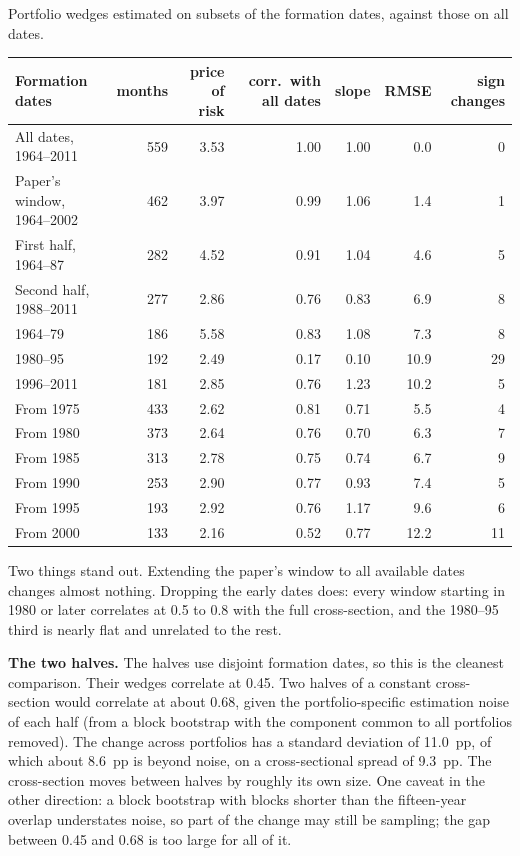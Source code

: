 \documentclass[11pt]{article}
\begin{document}
\begin{tbl}{Portfolio wedges estimated on subsets of the formation dates, against those on all dates.}
\begin{tabular}{lrrrrrr}\toprule
Formation dates & months & price of risk & corr.\ with all dates & slope & RMSE & sign changes\\\midrule
All dates, 1964--2011 & 559 & 3.53 & 1.00 & 1.00 & 0.0 & 0\\
Paper's window, 1964--2002 & 462 & 3.97 & 0.99 & 1.06 & 1.4 & 1\\
First half, 1964--87 & 282 & 4.52 & 0.91 & 1.04 & 4.6 & 5\\
Second half, 1988--2011 & 277 & 2.86 & 0.76 & 0.83 & 6.9 & 8\\
1964--79 & 186 & 5.58 & 0.83 & 1.08 & 7.3 & 8\\
1980--95 & 192 & 2.49 & 0.17 & 0.10 & 10.9 & 29\\
1996--2011 & 181 & 2.85 & 0.76 & 1.23 & 10.2 & 5\\
From 1975 & 433 & 2.62 & 0.81 & 0.71 & 5.5 & 4\\
From 1980 & 373 & 2.64 & 0.76 & 0.70 & 6.3 & 7\\
From 1985 & 313 & 2.78 & 0.75 & 0.74 & 6.7 & 9\\
From 1990 & 253 & 2.90 & 0.77 & 0.93 & 7.4 & 5\\
From 1995 & 193 & 2.92 & 0.76 & 1.17 & 9.6 & 6\\
From 2000 & 133 & 2.16 & 0.52 & 0.77 & 12.2 & 11\\
\bottomrule
\end{tabular}
\end{tbl}

Two things stand out. Extending the paper's window to all available dates
changes almost nothing. Dropping the early dates does: every window starting
in 1980 or later correlates at 0.5 to 0.8 with the full cross-section, and
the 1980--95 third is nearly flat and unrelated to the rest.

\textbf{The two halves.} The halves use disjoint formation dates, so this is
the cleanest comparison. Their wedges correlate at 0.45. Two halves of a
constant cross-section would correlate at about 0.68, given the
portfolio-specific estimation noise of each half (from a block bootstrap
with the component common to all portfolios removed). The change across
portfolios has a standard deviation of 11.0~pp, of which about
8.6~pp is beyond noise, on a cross-sectional spread of 9.3~pp.
The cross-section moves between halves by roughly its own size. One caveat
in the other direction: a block bootstrap with blocks shorter than the
fifteen-year overlap understates noise, so part of the change may still be
sampling; the gap between 0.45 and 0.68 is too large for all of it.
\end{document}

